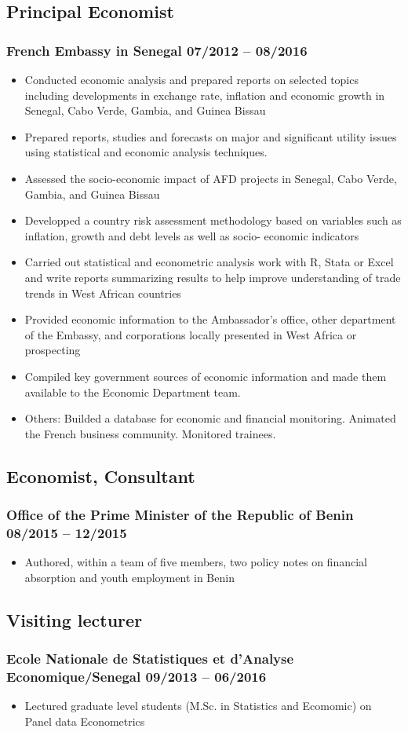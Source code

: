 \documentclass[9pt, oneside]{memoir}
\newcommand{\position}[2]{\subsubsection{#1
    \hfill
    #2}}
\begin{document}
{\subsection{Principal Economist}
\position{French Embassy in Senegal}{07/2012 -- 08/2016}
\begin{itemize}
\item Conducted economic analysis and prepared reports on selected topics including developments in exchange rate, inflation and economic growth in Senegal, Cabo Verde, Gambia, and Guinea Bissau
\item Prepared reports, studies and forecasts on major and significant utility issues using statistical and economic analysis techniques.
\item Assessed the socio-economic impact of AFD projects in Senegal, Cabo Verde, Gambia, and Guinea Bissau
\item Developped a country risk assessment methodology based on variables such as inflation, growth and debt levels as well as socio-
economic indicators
\item Carried out statistical and econometric analysis work with R, Stata or Excel and write reports summarizing results to help improve understanding of trade trends in West African countries
\item Provided economic information to the Ambassador's office, other department of the Embassy, and corporations locally presented in West Africa or prospecting 
\item Compiled key government sources of economic information and made them available to the Economic Department team.

\item Others: Builded a database for economic and financial monitoring. Animated the French business community. Monitored trainees.
\end{itemize}

\subsection{Economist, Consultant}
\position{Office of the Prime Minister of the Republic of Benin}{08/2015 -- 12/2015}
\begin{itemize}
\item Authored, within a team of five members, two policy notes on financial absorption and youth employment in Benin
\end{itemize}

\subsection{Visiting lecturer}
\position{Ecole Nationale de Statistiques et d'Analyse Economique/Senegal}{09/2013 -- 06/2016}
\begin{itemize}
\item Lectured graduate level students (M.Sc. in Statistics and Ecomomic) on Panel data Econometrics
\end{itemize}

}
\end{document}
